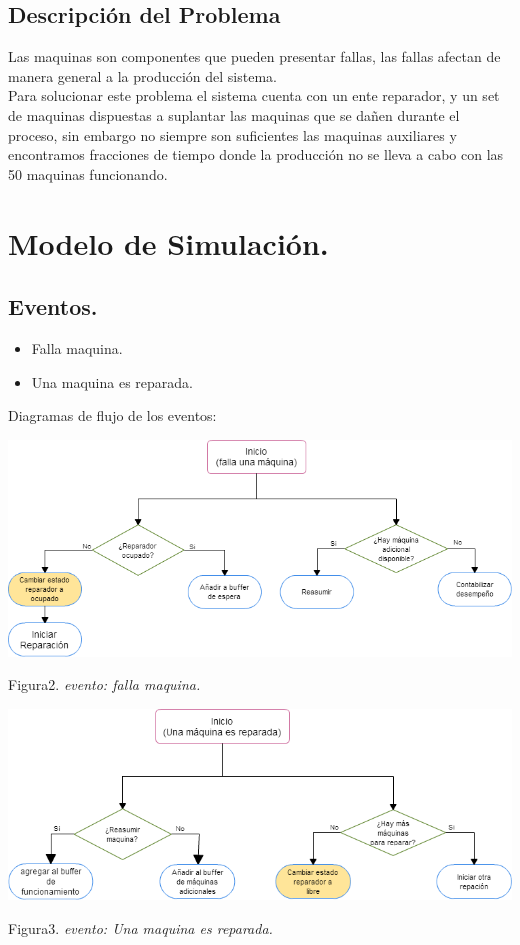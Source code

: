 \documentclass[10pt]{article}
\begin{document}
\subsection{Descripción del Problema}

Las maquinas son componentes que pueden presentar fallas, las fallas afectan de manera general a la producción del sistema.\\

Para solucionar este problema el sistema cuenta con un ente reparador, y un set de maquinas dispuestas a suplantar las maquinas que se dañen durante el proceso, sin embargo no siempre son suficientes las maquinas auxiliares y encontramos fracciones de tiempo donde la producción no se lleva a cabo con las 50 maquinas funcionando.




\section{Modelo de Simulación.}

\subsection{Eventos.}

\begin{itemize}
\item Falla maquina.
\item Una maquina es reparada.
\end{itemize}

Diagramas de flujo de los eventos:
\begin{center}

\includegraphics[scale=0.47]{fallaMaquina.png}

Figura2. \emph{evento: falla maquina.}
\end{center}
\begin{center}

\includegraphics[scale=0.47]{reparar.png}

Figura3. \emph{evento: Una maquina es reparada.}
\end{center}
\end{document}
